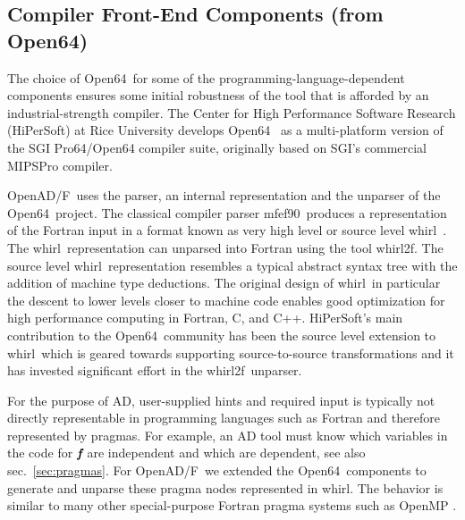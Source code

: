 \documentclass{book}
\newcommand{\mfefninety}{mfef90}
\newcommand{\OpenADF}{OpenAD/F}
\newcommand{\OpenSixtyFour}{Open64}
\newcommand{\whirl}{whirl}
\newcommand{\whirlTof}{whirl2f}
\newcommand{\bmf}{\mbox{\bf\em f}}
\newcommand{\refsec}[1]{{sec.~\ref{#1}}}
\begin{document}
\subsection{Compiler Front-End Components (from \OpenSixtyFour)} \label{sec:open64FeBe}

The choice of \OpenSixtyFour\ for some of the programming-language-dependent 
components ensures some initial robustness of the tool that is afforded by an 
industrial-strength compiler. 
The Center for High Performance Software Research (HiPerSoft) at Rice University 
develops \OpenSixtyFour\ \cite{open64Web} as a 
multi-platform version of the SGI Pro64/Open64 compiler
suite, originally based on SGI's commercial MIPSPro compiler.

\OpenADF\ uses the parser, an internal representation and the unparser 
of the \OpenSixtyFour\ project.
The classical compiler parser \mfefninety\ produces a representation of the Fortran 
input in a format known as very high level or source level \whirl\ . 
The \whirl\ representation can unparsed into Fortran using the 
tool \whirlTof.
The source level \whirl\
representation resembles a typical abstract syntax tree with the 
addition of machine type deductions. 
The original design of \whirl\ in particular the descent to 
lower levels closer to machine code  enables good optimization 
for high performance
computing in Fortran, C, and C++. HiPerSoft's main
contribution to the \OpenSixtyFour\ community has been the source 
level extension to \whirl\
which is geared towards supporting source-to-source transformations and 
it 
has invested significant effort in the \whirlTof\ unparser.

For the purpose of AD, user-supplied hints and required 
input is typically not directly
representable in programming languages such as Fortran and 
therefore represented by pragmas.  
For example,
an AD tool must know which variables in the code for $\bmf$ are
independent and which are dependent, see also \refsec{sec:pragmas}.
For \OpenADF\ we extended the
\OpenSixtyFour\ components to generate and unparse these pragma nodes represented in \whirl.
The behavior is 
similar to many other special-purpose Fortran pragma systems such as
OpenMP \cite{openmpWeb}. 
\end{document}

